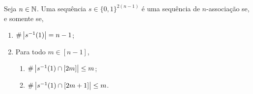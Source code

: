\begin{exercise}
Seja $n \in \mathbb{N}$. Uma sequência $s \in \{0,1\}^{2(n-1)}$ é uma sequência de $n$-associação se, e somente se,
	\begin{enumerate}
	\item $\#\left\lvert{s^{-1}(1)}\right\rvert = n-1$;
	\item Para todo $m \in [n-1]$,
		\begin{enumerate}
		\item $\#\left\lvert{s^{-1}(1) \cap [2m]}\right\rvert \leq m$;
		\item $\#\left\lvert{s^{-1}(1) \cap [2m+1]}\right\rvert \leq m$.
		\end{enumerate}
	\end{enumerate}
\end{exercise}
